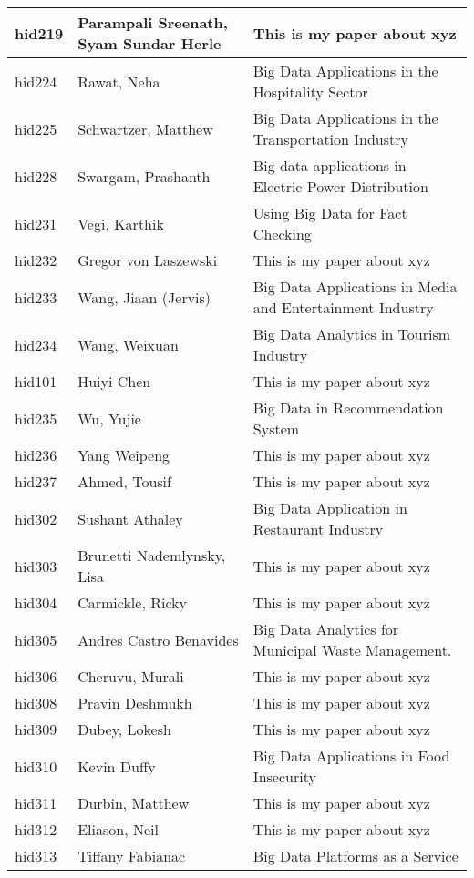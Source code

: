\documentclass[12pt]{article}
\begin{document}
\begin{footnotesize}
\begin{longtable}{|p{1cm}p{5cm}p{9cm}|}
\hline
hid219 & Parampali Sreenath, Syam Sundar Herle & This is my paper about xyz  \\
\hline
hid224 & Rawat, Neha & Big Data Applications in the Hospitality Sector  \\
\hline
hid225 & Schwartzer, Matthew & Big Data Applications in the Transportation Industry  \\
\hline
hid228 & Swargam, Prashanth & Big data applications in Electric Power Distribution  \\
\hline
hid231 & Vegi, Karthik & Using Big Data for Fact Checking  \\
\hline
hid232 & Gregor von Laszewski & This is my paper about xyz  \\
\hline
hid233 & Wang, Jiaan (Jervis) & Big Data Applications in Media and Entertainment Industry  \\
\hline
hid234 & Wang, Weixuan & Big Data Analytics in Tourism Industry  \\
\hline
hid101 & Huiyi Chen & This is my paper about xyz  \\
\hline
hid235 & Wu, Yujie & Big Data in Recommendation System  \\
\hline
hid236 & Yang Weipeng & This is my paper about xyz  \\
\hline
hid237 & Ahmed, Tousif & This is my paper about xyz  \\
\hline
hid302 & Sushant Athaley & Big Data Application in Restaurant Industry  \\
\hline
hid303 & Brunetti Nademlynsky, Lisa & This is my paper about xyz  \\
\hline
hid304 & Carmickle, Ricky & This is my paper about xyz  \\
\hline
hid305 & Andres Castro Benavides & Big Data Analytics for Municipal Waste Management.  \\
\hline
hid306 & Cheruvu, Murali & This is my paper about xyz  \\
\hline
hid308 & Pravin Deshmukh & This is my paper about xyz  \\
\hline
hid309 & Dubey, Lokesh & This is my paper about xyz  \\
\hline
hid310 & Kevin Duffy & Big Data Applications in Food Insecurity  \\
\hline
hid311 & Durbin, Matthew & This is my paper about xyz  \\
\hline
hid312 & Eliason, Neil & This is my paper about xyz  \\
\hline
hid313 & Tiffany Fabianac & Big Data Platforms as a Service  \\

\end{longtable}
\end{footnotesize}
\end{document}
